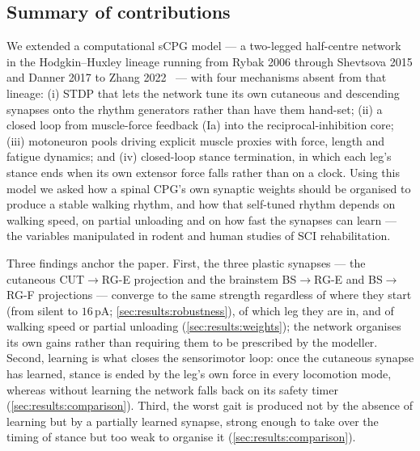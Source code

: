 \subsection{Summary of contributions}
We extended a computational sCPG model --- a two-legged half-centre
network in the Hodgkin--Huxley lineage
running from Rybak 2006 through Shevtsova 2015 and Danner 2017 to
Zhang 2022~\cite{rybak2006,shevtsova2015,danner2017,zhang2022} --- with four
mechanisms absent from that lineage: (i)
STDP that lets the network tune its own
cutaneous and descending synapses onto the rhythm generators rather than have
them hand-set; (ii) a closed loop from muscle-force feedback (Ia) into the
reciprocal-inhibition core; (iii) motoneuron pools driving explicit muscle
proxies with force, length and fatigue dynamics; and (iv) closed-loop stance
termination, in which each leg's stance ends when its own extensor force falls
rather than on a clock. Using this model we asked how a spinal
CPG's own synaptic weights should be organised to produce a stable walking
rhythm, and how that self-tuned rhythm depends on walking speed, on partial
unloading and on how fast the synapses can learn --- the variables manipulated
in rodent and human studies of SCI rehabilitation.

Three findings anchor the paper. First, the three plastic synapses --- the
cutaneous CUT$\to$RG-E projection and the brainstem BS$\to$RG-E and
BS$\to$RG-F projections --- converge to the same strength regardless of where
they start (from silent to $16$\,pA; \autoref{sec:results:robustness}), of
which leg they are in, and of walking speed or partial unloading
(\autoref{sec:results:weights}); the network organises its own gains rather
than requiring them to be prescribed by the modeller. Second, learning is what
closes the sensorimotor loop: once the cutaneous synapse has learned, stance is
ended by the leg's own force in every locomotion mode, whereas without learning
the network falls back on its safety timer (\autoref{sec:results:comparison}).
Third, the worst gait is produced not by the absence of learning but by a
partially learned synapse, strong enough to take over the timing of stance but
too weak to organise it (\autoref{sec:results:comparison}).

